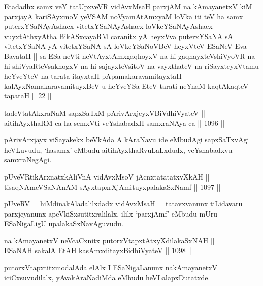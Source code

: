 \begin{kandikeshl}
Etadadhx samx veY tatUpxveVR vidAvxMsaH parxjAM na kAmayanetxV kiM parxjayA kariSAyxmoV yeVSAM noV\s yamAtAmxyaM loVka iti teV ha samx puterxYSaNAyAshacx vitetxYSaNAyAshacx loVkeYSaNAyAshacx vuyxtAthxyAtha BikASxcayaRM caranitx yA heyxVva puterxYSaNA sA vitetxYSaNA yA vitetxYSaNA sA loVkeYSaNoVBeV heyxVteV ESaNeV Eva BavataH || sa ESa neVti neVtAyxtAmxgaqhoyxV na hi gaqhayxteV\s shiVyoVR na hi shiVyaRteV\s saknogxV na hi sajayxteV\s sitoV na vayxthateV na riSayxteyxVtamu heYveYteV na tarata itayxtaH pApamakaravamitayxtaH kalAyxNamakaravamituyxBeV u heYveYSa EteV tarati neYnaM kaqtAkaqteV tapataH || 22 ||
\end{kandikeshl}

\begin{shl}
tadeVtatAkxraNaM sapxSaTxM pArivArxjeyxV\s BiVdhiVyateV || \\
aitihAyxthaRM ca ha semxVti veYshabadxH samxraNAya ca \hfill || 1096 ||  
\end{shl}

\begin{artha}
pArivArxjayx viSayakekx beVkAda A kAraNavu ide eMbudAgi sapxSaTxvAgi heVLuvudu, `hasamx' eMbudu aitihAyxthaRvuLaLxdudx, veYshabadxvu samxraNegAgi.
\end{artha}

\begin{shl}
pUveVR\s tikArxnatxkAliVnA vidAvxMsoV jAcnxtatatatxvXkAH || \\
tisaqNAmeVSaNAnAM sAyxtapxrXjAmituyxpalakaSxNamf \hfill || 1097 ||  
\end{shl}

\begin{artha}
pUveRV = hiMdinakAladalilxdadx vidAvxMsaH = tatavxvanunx tiLidavaru parxjeyanunx apeVkiSxsutitxralilalx, ililx `parxjAmf' eMbudu mUru ESaNigaLigU upalakaSxNavAguvudu.
\end{artha}

\begin{shl}
na kAmayanetxV neVcaCxnitx putorxVtapxtAtxyXdilakaSxNAH || \\
ESaNAH sakalA EtAH kasAmxditayxBidhiVyateV \hfill || 1098 ||  
\end{shl}

\begin{artha}
putorxVtapxtitxmodalAda elAlx I ESaNigaLanunx nakAmayanetxV =  iciCxsuvudilalx, yAvakAraNadiMda eMbudu heVLalapxDutatxde.
\end{artha}

